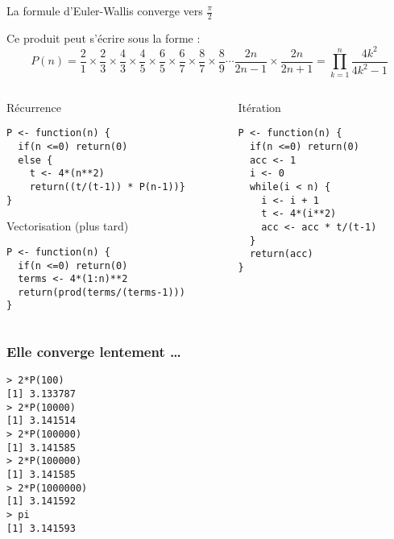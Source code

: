 \documentclass[10pt]{beamer}
\begin{document}
 \questionSlide

 \appendix
 \backupSlides

 \begin{frame}[fragile]{La formule d'Euler-Wallis converge vers $\frac{\pi}{2}$}

   Ce produit peut s'écrire sous la forme :
    $$
    P(n) = {\frac {2}{1}}\times {\frac {2}{3}}\times {\frac {4}{3}}\times {\frac {4}{5}}\times {\frac {6}{5}}\times {\frac {6}{7}}\times {\frac {8}{7}}\times {\frac {8}{9}}\cdots {\frac {2n}{2n-1}}\times {\frac {2n}{2n+1}}
    = \prod_{k=1}^n \frac{4k^2}{4k^2-1}
    $$
    \vspace{-10pt}
    \begin{columns}[t]
      \begin{column}{0.53\textwidth}
  \begin{block}{Récurrence}
    \begin{lstlisting}[style=edblock]
P <- function(n) {
  if(n <=0) return(0)
  else {
    t <- 4*(n**2)
    return((t/(t-1)) * P(n-1))}
}
\end{lstlisting}
\end{block}
\begin{block}{Vectorisation (plus tard)}
    \begin{lstlisting}[style=edblock]
P <- function(n) {
  if(n <=0) return(0)
  terms <- 4*(1:n)**2
  return(prod(terms/(terms-1)))
}
\end{lstlisting}
  \end{block}

\end{column}
\begin{column}{0.47\textwidth}
  \begin{block}{Itération}
    \begin{lstlisting}[style=edblock]
P <- function(n) {
  if(n <=0) return(0)
  acc <- 1
  i <- 0
  while(i < n) {
    i <- i + 1
    t <- 4*(i**2)
    acc <- acc * t/(t-1)
  }
  return(acc)
}
\end{lstlisting}
  \end{block}
\end{column}
\end{columns}

\end{frame}


\begin{frame}[fragile]
  \frametitle{Elle converge lentement \dots}
  \begin{lstlisting}
> 2*P(100)
[1] 3.133787
> 2*P(10000)
[1] 3.141514
> 2*P(100000)
[1] 3.141585
> 2*P(100000)
[1] 3.141585
> 2*P(1000000)
[1] 3.141592
> pi
[1] 3.141593
\end{lstlisting}

\end{frame}



\end{document}

